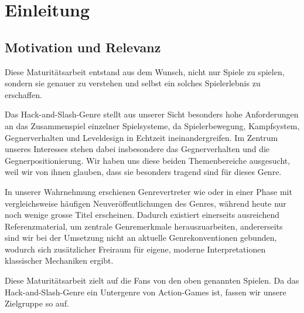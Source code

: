 \documentclass[../Main.tex]{subfiles}
\begin{document}
\section{Einleitung}

\subsection{Motivation und Relevanz}

Diese Maturitätsarbeit entstand aus dem Wunsch, nicht nur Spiele zu spielen, sondern sie genauer zu verstehen und selbst ein solches Spielerlebnis zu erschaffen.

Das Hack-and-Slash-Genre stellt aus unserer Sicht besonders hohe Anforderungen an das Zusammenspiel einzelner Spielsysteme, da Spielerbewegung, Kampfsystem, Gegnerverhalten und Leveldesign in Echtzeit ineinandergreifen. Im Zentrum unseres Interesses stehen dabei insbesondere das Gegnerverhalten und die Gegnerpositionierung. Wir haben uns diese beiden Themenbereiche ausgesucht, weil wir von ihnen glauben, dass sie besonders tragend sind für dieses Genre.

In unserer Wahrnehmung erschienen Genrevertreter wie  oder  in einer Phase mit vergleichsweise häufigen Neuveröffentlichungen des Genres, während heute nur noch wenige grosse Titel erscheinen. Dadurch existiert einerseits ausreichend Referenzmaterial, um zentrale Genremerkmale herauszuarbeiten, andererseits sind wir bei der Umsetzung nicht an aktuelle Genrekonventionen gebunden, wodurch sich zusätzlicher Freiraum für eigene, moderne Interpretationen klassischer Mechaniken ergibt.

Diese Maturitätsarbeit zielt auf die Fans von den oben genannten Spielen. Da das Hack-and-Slash-Genre ein Untergenre von Action-Games ist, fassen wir unsere Zielgruppe so auf.
\end{document}
